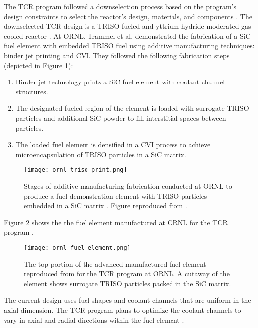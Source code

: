 The \gls{TCR} program followed a downselection process based on the program's 
design constraints to select the reactor's design, materials, and components
\cite{betzler_transformational_2020}.
The downselected TCR design is a TRISO-fueled and yttrium hydride moderated 
gas-cooled reactor \cite{betzler_transformational_2020}.
At \gls{ORNL}, Trammel et al. \cite{trammell_advanced_2019} demonstrated 
the fabrication of a SiC fuel element with embedded \gls{TRISO} fuel using 
additive manufacturing techniques: binder jet printing and \gls{CVI}. 
They followed the following fabrication steps (depicted in Figure 
\ref{fig:ornl-triso-print}): 
\begin{enumerate}
    \item Binder jet technology prints a SiC fuel element with coolant channel 
    structures. 
    \item The designated fueled region of the element is loaded with surrogate 
    \gls{TRISO} particles and additional SiC powder to fill interstitial spaces
    between particles. 
    \item The loaded fuel element is densified in a \gls{CVI} process to achieve 
    microencapsulation of \gls{TRISO} particles in a SiC matrix. 
\end{enumerate}
\begin{figure}[btp]
    \centering
    \texttt{[image: ornl-triso-print.png]} 
    \caption{Stages of additive manufacturing fabrication conducted at \acrlong{ORNL} to 
    produce a fuel demonstration element with \gls{TRISO} particles embedded in 
    a SiC matrix \cite{trammell_advanced_2019}. Figure reproduced from 
    \cite{trammell_advanced_2019}.}
    \label{fig:ornl-triso-print}
\end{figure}
Figure \ref{fig:ornl-fuel-element} shows the the fuel element manufactured at 
\gls{ORNL} for the \gls{TCR} program \cite{betzler_transformational_2020}. 
\begin{figure}[btp]
    \centering
    \texttt{[image: ornl-fuel-element.png]} 
    \caption{The top portion of the advanced manufactured fuel element 
    reproduced from \cite{betzler_transformational_2020} for the \acrfull{TCR} 
    program at \acrfull{ORNL}. A cutaway of the element shows surrogate TRISO 
    particles packed in the SiC matrix.}
    \label{fig:ornl-fuel-element}
\end{figure}
The current design uses fuel shapes and coolant channels that are uniform in the 
axial dimension. 
The \gls{TCR} program plans to optimize the coolant channels to vary in axial 
and radial directions within the fuel element 
\cite{betzler_transformational_2020,sobes_artificial_2020}. 

